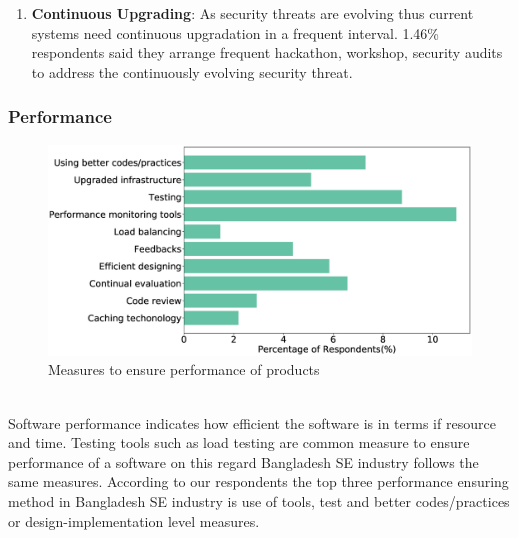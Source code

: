 \begin{enumerate}
    \item \textbf{Continuous Upgrading}: As security threats are evolving thus current systems need continuous upgradation in a frequent interval. 1.46\% respondents said they arrange frequent hackathon, workshop, security audits to address the continuously evolving security threat.
    

   
\end{enumerate}

\subsubsection{Performance}
\label{Performance}
\begin{figure}[htbp]
\includegraphics[scale=0.28]{Figures/Performance.eps} 
\caption{Measures to ensure performance of products}
\label{fig:Measures to ensure performance}
\end{figure}
\hfill\\
Software performance indicates how efficient the software is in terms if resource and time. Testing tools such as load testing are common measure\cite{Liu2009} to ensure performance of a software on this regard Bangladesh SE industry follows the same measures. According to our respondents the top three performance ensuring method in Bangladesh SE industry is use of tools, test and better codes/practices or design-implementation level measures. 

